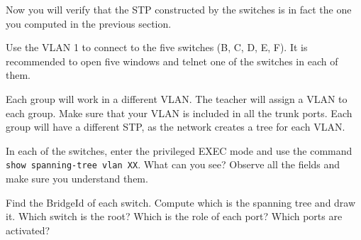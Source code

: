 Now you will verify that the STP constructed by the switches is in fact the one you computed in the previous section.

Use the VLAN 1 to connect to the five switches (B, C, D, E, F).
It is recommended to open five windows and telnet one of the switches in each of them.

Each group will work in a different VLAN.
The teacher will assign a VLAN to each group.
Make sure that your VLAN is included in all the trunk ports.
Each group will have a different STP, as the network creates a tree for each VLAN.

In each of the switches, enter the privileged EXEC mode and use the command \texttt{show spanning-tree vlan XX}.
What can you see?
Observe all the fields and make sure you understand them.

Find the BridgeId of each switch.
Compute which is the spanning tree and draw it.
Which switch is the root?
Which is the role of each port?
Which ports are activated?


